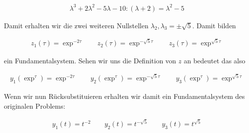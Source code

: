 \begin{solution}
  \begin{align*}
    \lambda^3 + 2\lambda^2 -5\lambda - 10 : (\lambda + 2) = \lambda^2 - 5
  \end{align*}

  Damit erhalten wir die zwei weiteren Nullstellen
  $\lambda_2, \lambda_3 = \pm \sqrt{5}$. Damit bilden

  \begin{align*}
    z_1(\tau)=\exp^{-2\tau} \qquad z_2 (\tau)=\exp^{-\sqrt{5}\tau} \qquad
    z_3 (\tau)=\exp^{\sqrt{5}\tau}
  \end{align*}

  ein Fundamentalsystem. Sehen wir uns die Definition von $z$ an bedeutet das also

  \begin{align*}
    y_1 (\exp^\tau) = \exp^{-2\tau} \qquad y_2 (\exp^\tau)=\exp^{-\sqrt{5}\tau} \qquad
    y_3 (\exp^\tau)=\exp^{\sqrt{5}\tau}
  \end{align*}

  Wenn wir nun Rücksubstituieren erhalten wir damit ein Fundamentalsystem des originalen
  Problems:

  \begin{align*}
    y_1 (t) = t^{-2} \qquad y_2 (t) = t^{-\sqrt{5}} \qquad y_3 (t) = t^{\sqrt{5}}
  \end{align*}
\end{solution}
